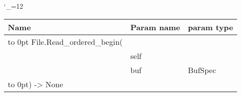 \begingroup \catcode`\_=12 \tt
\begin{tabular}{lll}
\toprule
\textrm{Name}&\textrm{Param name}&\textrm{param type}\\
\midrule
\hbox to 0pt {File.Read_ordered_begin(\hss}\\
& self\\
& buf & BufSpec\\
\hbox to 0pt{) -> None\hss}\\
\bottomrule
\end{tabular}
\endgroup
